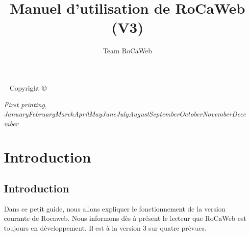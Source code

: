 \documentclass[a4paper,10pt,justified,openany]{tufte-book}
\title{Manuel d'utilisation de RoCaWeb (V3)}
\author{Team RoCaWeb}
\newcommand{\monthyear}{\ifcase\month\or January\or February\or March\or April\or May\or June\or July\or August\or September\or October\or November\or December\fi\space\number\year} %
\begin{document}
\frontmatter



\maketitle %


\newpage
\begin{fullwidth}
~\vfill
\thispagestyle{empty}
\setlength{\parindent}{0pt}
\setlength{\parskip}{\baselineskip}
Copyright \copyright\ \the\year\ \thanklessauthor

\par{}



\par\textit{First printing, \monthyear}
\end{fullwidth}


\tableofcontents %









\chapter{Introduction}
\section{Introduction}
Dans ce petit guide, nous allons expliquer le fonctionnement de la version courante de Rocaweb. Nous informons dès à présent le lecteur
que RoCaWeb est toujours en développement. Il est à la version 3 sur quatre  prévues. 
\end{document}
